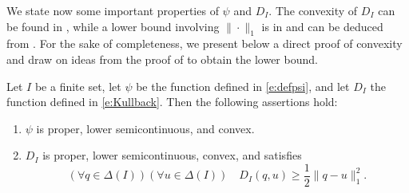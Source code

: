 \documentclass[smallextended,referee,envcountsect,]{svjour3}
\begin{document}
We state now some 
important 
properties of $\psi$ and $D_I$. The convexity of $D_I$ can be 
found in 
\cite[Theorem 2.7.2]{cover-book-2006}, {while a lower 
bound involving $\|\cdot\|_1$ is in 
\cite[Lemma~11.6.1]{cover-book-2006} and can be deduced from 
\cite[Proposition~5.1 \& Remark~5.1]{BeckTeb03}. 
For the sake of completeness, we present below a direct proof of 
convexity and draw on ideas from the proof of 
\cite[Proposition~5.1]{BeckTeb03} to obtain the lower bound.
}
\begin{proposition}
\label{p:KLprop}
Let $I$ be a finite set, let $\psi$ be the function defined 
in \eqref{e:defpsi}, and let $D_I$ the 
function defined in \eqref{e:Kullback}. Then the following 
assertions 
hold:
\begin{enumerate}
\item 
\label{p:KLpropi}
$\psi$ is proper, lower semicontinuous, and convex.
\item 
\label{p:KLpropii}
$D_I$ is proper, lower semicontinuous, convex, and satisfies
\begin{equation}
\label{e:fortmon}
(\forall q\in\Delta(I))(\forall u\in\Delta(I))\quad 
D_I(q,u)\ge\frac{1}{2}\|q-u\|^2_1.
\end{equation}
\end{enumerate}
\end{proposition}
\end{document}
